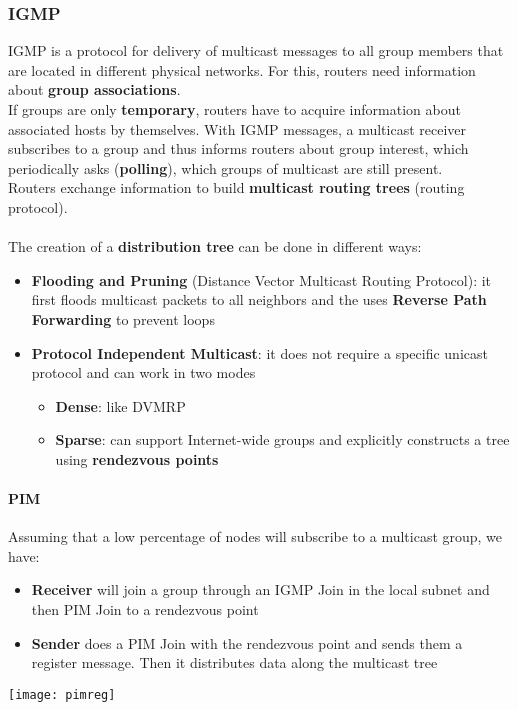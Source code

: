 \subsubsection{IGMP}
IGMP is a protocol for delivery of multicast messages to all group members that are located in different physical networks. For this, routers need information about \textbf{group associations}.\\
If groups are only \textbf{temporary}, routers have to acquire information about associated hosts by themselves. With  IGMP messages, a multicast receiver subscribes to a group and thus informs routers about group interest, which periodically asks (\textbf{polling}), which groups of multicast are still present.\\
Routers exchange information to build \textbf{multicast routing trees} (routing protocol).\\\\
The creation of a \textbf{distribution tree} can be done in different ways:
\begin{itemize}
	\item \textbf{Flooding and Pruning} (Distance Vector Multicast Routing Protocol): it first floods multicast packets to all neighbors and the uses \textbf{Reverse Path Forwarding} to prevent loops
	\item \textbf{Protocol Independent Multicast}: it does not require a specific unicast protocol and can work in two modes
	\begin{itemize}
		\item \textbf{Dense}: like DVMRP
		\item \textbf{Sparse}: can support Internet-wide groups and explicitly constructs a tree using \textbf{rendezvous points}
	\end{itemize}
\end{itemize}

\newpage
\paragraph{PIM} Assuming that a low percentage of nodes will subscribe to a multicast group, we have:
\begin{itemize}
	\item \textbf{Receiver} will join a group through an IGMP Join in the local subnet and then PIM Join to a rendezvous point
	\item \textbf{Sender} does a PIM Join with the rendezvous point and sends them a register message. Then it distributes data along the multicast tree
\end{itemize}
\begin{center}
	\texttt{[image: pimreg]}
\end{center}


